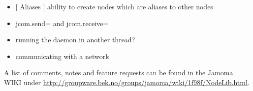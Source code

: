 \documentclass[]{article}
\begin{document}
\begin{itemize}

	\item {[ Aliases ] ability to create nodes which are aliases to other nodes}

	\item {jcom.send= and jcom.receive=}

	\item {running the daemon in another thread?}

	\item {communicating with a network}

\end{itemize}

A list of comments, notes and feature requests can be found in the Jamoma WIKI under \url{http://groupware.bek.no/groups/jamoma/wiki/1f98f/NodeLib.html}. 





\end{document}
